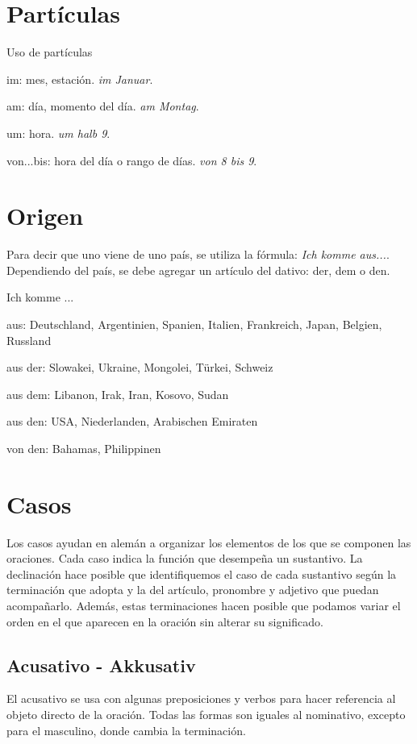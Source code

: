 \section{Partículas}
Uso de partículas
\begin{myitemize}
\item im: mes, estación. \textit{im Januar}.
\item am: día, momento del día. \textit{ am Montag}.
\item um: hora. \textit{um halb 9}.
\item von...bis: hora del día o rango de días. \textit{von 8 bis 9}.
\end{myitemize}

\section{Origen}
Para decir que uno viene de uno país, se utiliza la fórmula: \textit{Ich komme aus...}. Dependiendo del país, se debe agregar un artículo del dativo: der, dem o den.

Ich komme ...
\begin{myitemize}
\item aus: Deutschland, Argentinien, Spanien, Italien, Frankreich, Japan, Belgien, Russland
\item aus der: Slowakei, Ukraine, Mongolei, Türkei, Schweiz
\item aus dem: Libanon, Irak, Iran, Kosovo, Sudan
\item aus den: USA, Niederlanden, Arabischen Emiraten
\item von den: Bahamas, Philippinen
\end{myitemize}


\section{Casos}
Los casos ayudan en alemán a organizar los elementos de los que se componen las oraciones. Cada caso indica la función que desempeña un sustantivo. La declinación hace posible que identifiquemos el caso de cada sustantivo según la terminación que adopta y la del artículo, pronombre y adjetivo que puedan acompañarlo. Además, estas terminaciones hacen posible que podamos variar el orden en el que aparecen en la oración sin alterar su significado.

\subsection{Acusativo - Akkusativ}
El acusativo se usa con algunas preposiciones y verbos para hacer referencia al objeto directo de la oración. Todas las formas son iguales al nominativo, excepto para el masculino, donde cambia la terminación. 

